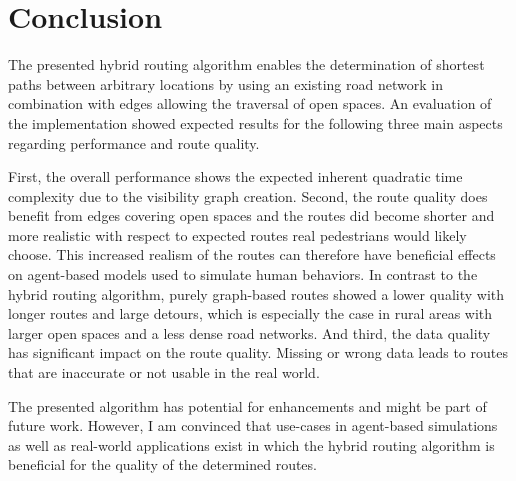 \section{Conclusion}

	The presented hybrid routing algorithm enables the determination of shortest paths between arbitrary locations by using an existing road network in combination with edges allowing the traversal of open spaces.
	An evaluation of the implementation showed expected results for the following three main aspects regarding performance and route quality.
	
	First, the overall performance shows the expected inherent quadratic time complexity due to the visibility graph creation.
	Second, the route quality does benefit from edges covering open spaces and the routes did become shorter and more realistic with respect to expected routes real pedestrians would likely choose.
	This increased realism of the routes can therefore have beneficial effects on agent-based models used to simulate human behaviors.
	In contrast to the hybrid routing algorithm, purely graph-based routes showed a lower quality with longer routes and large detours, which is especially the case in rural areas with larger open spaces and a less dense road networks.
	And third, the data quality has significant impact on the route quality.
	Missing or wrong data leads to routes that are inaccurate or not usable in the real world.
	
	The presented algorithm has potential for enhancements and might be part of future work.
	However, I am convinced that use-cases in agent-based simulations as well as real-world applications exist in which the hybrid routing algorithm is beneficial for the quality of the determined routes.